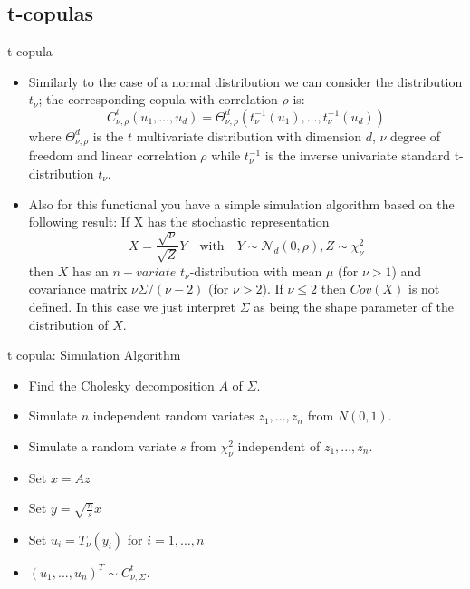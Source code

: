\documentclass[11pt]{beamer}
\theoremstyle{plain}
\theoremstyle{definition}
\theoremstyle{remark}
\begin{document}
\subsection{t-copulas}
%
\begin{frame}{t copula}
\footnotesize{
   \begin{itemize}
    \item 
    	Similarly to the case of a normal distribution we can consider the distribution 
    	$t_\nu$; the corresponding copula with correlation $\rho$ is:
		\begin{equation}
						C^t_{\nu, \rho}(u_1,\dots,u_d) = \Theta^d_{\nu, \rho} 
						(t^{-1}_\nu(u_1),\dots,t^{-1}_\nu(u_d))
		\end{equation}
		where $\Theta^d_{\nu, \rho}$ is the $t$ multivariate distribution with dimension $d
		$, $\nu$ degree of freedom and linear correlation $\rho$ while $t^{-1}_\nu$ is the 
		inverse univariate standard t-distribution $t_\nu$.
	\item 
		Also for this functional you have a simple simulation algorithm based on the 
		following result: If X has the stochastic representation
		$$
			X=\frac{\sqrt{\nu}}{\sqrt{Z}}Y \quad \text{with} \quad Y \sim \mathcal{N}_d(0,
			\rho), Z \sim \chi^2_\nu 
		$$
		then $X$ has an $n-variate$ $t_\nu$-distribution with mean $\mu$ (for $\nu > 1$) and 
		covariance matrix $\nu \Sigma/(\nu-2)$ (for $\nu > 2$). If $\nu \le 2$ then $Cov(X)$ 
		is not defined. In this case we just interpret $\Sigma$ as being the shape parameter 
		of the distribution of $X$.
   \end{itemize}
}
\end{frame}
%
\begin{frame}{t copula: Simulation Algorithm}
   \begin{itemize}
		\item Find the Cholesky decomposition $A$ of $\Sigma$.
		\item Simulate $n$ independent random variates $z_1, . . . , z_n$ from $N (0, 1)$.
		\item Simulate a random variate $s$  from $\chi^2_\nu$ independent of $z_1, . . . , 
		z_n$.
		\item Set $x=Az$
		\item Set $y = \sqrt{\frac{n}{s}} x$ 
		\item Set $u_i = T_\nu(y_i)$ for $i=1,\dots,n$
		\item $(u_1,...,u_n)^T \sim C^t_{\nu, \Sigma}$.   
   \end{itemize}
\end{frame}
\end{document}
